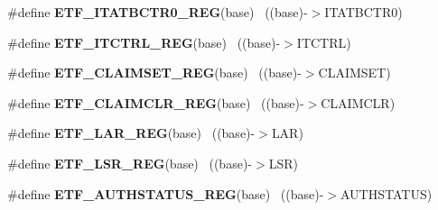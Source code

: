 \begin{DoxyCompactItemize}
\item 
\hypertarget{group___e_t_f___register___accessor___macros_ga6ebd31f02cbd86ae5ef2ed2df8ca432d}{}\#define {\bfseries E\+T\+F\+\_\+\+I\+T\+A\+T\+B\+C\+T\+R0\+\_\+\+R\+E\+G}(base)                                ~((base)-\/$>$I\+T\+A\+T\+B\+C\+T\+R0)\label{group___e_t_f___register___accessor___macros_ga6ebd31f02cbd86ae5ef2ed2df8ca432d}

\item 
\hypertarget{group___e_t_f___register___accessor___macros_ga918b6dc59d132cd28982b2db5a9da5e3}{}\#define {\bfseries E\+T\+F\+\_\+\+I\+T\+C\+T\+R\+L\+\_\+\+R\+E\+G}(base)                                      ~((base)-\/$>$I\+T\+C\+T\+R\+L)\label{group___e_t_f___register___accessor___macros_ga918b6dc59d132cd28982b2db5a9da5e3}

\item 
\hypertarget{group___e_t_f___register___accessor___macros_gaf42e2c82c7c3f8b0b92c0220651a307b}{}\#define {\bfseries E\+T\+F\+\_\+\+C\+L\+A\+I\+M\+S\+E\+T\+\_\+\+R\+E\+G}(base)                                  ~((base)-\/$>$C\+L\+A\+I\+M\+S\+E\+T)\label{group___e_t_f___register___accessor___macros_gaf42e2c82c7c3f8b0b92c0220651a307b}

\item 
\hypertarget{group___e_t_f___register___accessor___macros_ga312f63051726e4353cc7327885a2944c}{}\#define {\bfseries E\+T\+F\+\_\+\+C\+L\+A\+I\+M\+C\+L\+R\+\_\+\+R\+E\+G}(base)                                  ~((base)-\/$>$C\+L\+A\+I\+M\+C\+L\+R)\label{group___e_t_f___register___accessor___macros_ga312f63051726e4353cc7327885a2944c}

\item 
\hypertarget{group___e_t_f___register___accessor___macros_gad3ed858ce6cb420afbb17f92ccd66aa1}{}\#define {\bfseries E\+T\+F\+\_\+\+L\+A\+R\+\_\+\+R\+E\+G}(base)                                            ~((base)-\/$>$L\+A\+R)\label{group___e_t_f___register___accessor___macros_gad3ed858ce6cb420afbb17f92ccd66aa1}

\item 
\hypertarget{group___e_t_f___register___accessor___macros_gab11d6e472c1d965bcf67965110dfdc3d}{}\#define {\bfseries E\+T\+F\+\_\+\+L\+S\+R\+\_\+\+R\+E\+G}(base)                                            ~((base)-\/$>$L\+S\+R)\label{group___e_t_f___register___accessor___macros_gab11d6e472c1d965bcf67965110dfdc3d}

\item 
\hypertarget{group___e_t_f___register___accessor___macros_ga9f4398ed01d6b173c9dcb969e6188d5e}{}\#define {\bfseries E\+T\+F\+\_\+\+A\+U\+T\+H\+S\+T\+A\+T\+U\+S\+\_\+\+R\+E\+G}(base)                              ~((base)-\/$>$A\+U\+T\+H\+S\+T\+A\+T\+U\+S)\label{group___e_t_f___register___accessor___macros_ga9f4398ed01d6b173c9dcb969e6188d5e}


\end{DoxyCompactItemize}
